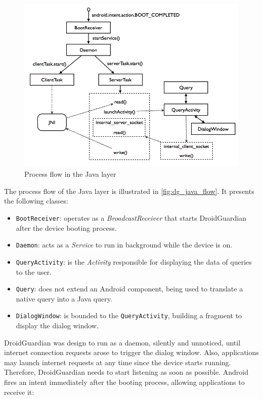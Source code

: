 \begin{figure}[h]
 \centering
 \includegraphics[scale=0.5]{figures/dg_java_flow.png}
 \caption{Process flow in the Java layer}
 \label{fig:dg_java_flow}
\end{figure}

The process flow of the Java layer is illustrated in \autoref{fig:dg_java_flow}. It presents the following classes:

\begin{itemize}
\item \texttt{BootReceiver}: operates as a \textit{BroadcastReceiver} that starts DroidGuardian after the device booting process.
\item \texttt{Daemon}: acts as a \textit{Service} to run in background while the device is on.
\item \texttt{QueryActivity}: is the \textit{Activity} responsible for displaying the data of queries to the user.
\item \texttt{Query}: does not extend an Android component, being used to translate a native query into a Java query.
\item \texttt{DialogWindow}: is bounded to the \texttt{QueryActivity}, building a fragment to display the dialog window.
\end{itemize}

DroidGuardian was design to run as a daemon, silently and unnoticed, until internet connection requests arose to trigger the dialog window.  Also, applications may launch internet requests at any time since the device starts running. Therefore, DroidGuardian needs to start listening as soon as possible. Android fires an intent immediately after the booting process, allowing applications to receive it:

